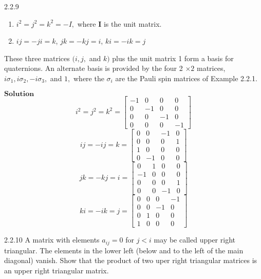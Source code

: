 \documentclass{article}
\begin{document}
\begin{flushleft}
\begin{mybox}{2.2.9}
\begin{enumerate}[$(a)$]
\item $i^{2}=j^{2}=k^{2}=-I,$ where $\mathbf{I}$ is the unit matrix. 
\item $ij=-ji=k$, $jk=-k j=i$, $ki=-ik=j$
\end{enumerate}

These three matrices $(i, j,$ and $k)$ plus the unit matrix 1 form a basis for quaternions. An alternate basis is provided by the four 2 $\times 2$ matrices, $i \sigma_{1}, i \sigma_{2},-i \sigma_{3},$ and $1,$ where the $\sigma_{i}$ are the Pauli spin matrices of Example 2.2.1.
\end{mybox}


$\boxed{\textbf{Solution}}$ 
$$i^2=j^2 = k^2 =\begin{bmatrix}{-1} & {0} & {0} & {0} \\ {0} & {-1} & {0} & {0} \\ {0} & {0} & {-1} & {0} \\ {0} & {0} & {0} & {-1}\end{bmatrix}$$
$$ij = -ij = k =\begin{bmatrix}{0} & {0} & {-1} & {0} \\ {0} & {0} & {0} & {1} \\ {1} & {0} & {0} & {0} \\ {0} & {-1} & {0} & {0}\end{bmatrix} $$
$$jk=-kj=i=\begin{bmatrix}{0} & {1} & {0} & {0} \\ {-1} & {0} & {0} & {0} \\ {0} & {0} & {0} & {1} \\ {0} & {0} & {-1} & {0}\end{bmatrix}$$
$$ki=-ik=j = \begin{bmatrix}{0} & {0} & {0} & {-1} \\ {0} & {0} & {-1} & {0} \\ {0} & {1} & {0} & {0} \\ {1} & {0} & {0} & {0}\end{bmatrix}$$

\newpage


\begin{mybox}{2.2.10}
A matrix with elements $a_{i j}=0$ for $j<i$ may be called upper right triangular. The
elements in the lower left (below and to the left of the main diagonal) vanish. Show that
the product of two uper right triangular matrices is an upper right triangular matrix. 
\end{mybox}




\end{flushleft}
\end{document}
